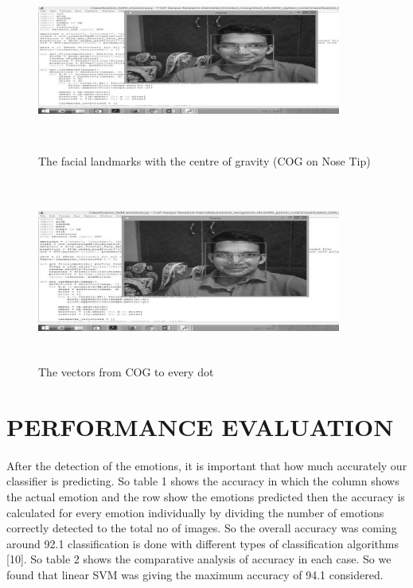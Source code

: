 \documentclass[a4paper,12pt,oneside]{article}
\begin{document}
\newpage
\hfill \break
\hfill \break
\begin{figure}[H]
\centering
\includegraphics[height=6cm,width=10cm]{Facial-emotion-recognition-in-real-time-and-static-images-032.jpg}
\caption{The facial landmarks with the centre of gravity (COG
on Nose Tip)}
\end{figure}

\hfill \break
\begin{figure}[H]
\centering
\includegraphics[height=6cm,width=10cm]{Facial-emotion-recognition-in-real-time-and-static-images-033.jpg}
\caption{The vectors from COG to every dot}
\end{figure}


\newpage
\section{PERFORMANCE EVALUATION}
\paragraph{}
After the detection of the emotions, it is important that
how much accurately our classifier is predicting. So table
1 shows the accuracy in which the column shows the
actual emotion and the row show the emotions predicted
then the accuracy is calculated for every emotion
individually by dividing the number of emotions
correctly detected to the total no of images. So the
overall accuracy was coming around 92.1%
classification is done with different types of
classification algorithms [10]. So table 2 shows the
comparative analysis of accuracy in each case. So we
found that linear SVM was giving the maximum
accuracy of 94.1%
considered.
\end{document}
